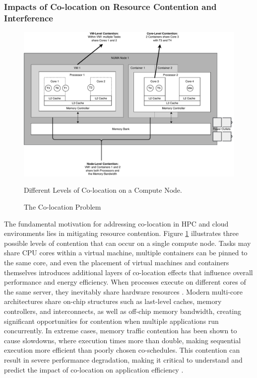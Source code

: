 \subsubsection{Impacts of Co-location on Resource Contention and Interference}
\label{sec:background_colocation_interference}

\begin{figure}[H]
    \centering
    \includegraphics[scale=0.5]{fig/02/02-coloc-overview.pdf}
    \small
    \caption{The Co-location Problem}
    \label{fig:02-coloc-overview}
    \tiny
    Different Levels of Co-location on a Compute Node.
\end{figure}

The fundamental motivation for addressing co-location in HPC and cloud environments lies in mitigating resource contention. Figure \ref{fig:02-coloc-overview} illustrates three possible levels of contention that can occur on a single compute node. Tasks may share CPU cores within a virtual machine, multiple containers can be pinned to the same core, and even the placement of virtual machines and containers themselves introduces additional layers of co-location effects that influence overall performance and energy efficiency. When processes execute on different cores of the same server, they inevitably share hardware resources \cite{Blagodurov_2010} \cite{7349920}. Modern multi-core architectures share on-chip structures such as last-level caches, memory controllers, and interconnects, as well as off-chip memory bandwidth, creating significant opportunities for contention when multiple applications run concurrently. In extreme cases, memory traffic contention has been shown to cause slowdowns, where execution times more than double, making sequential execution more efficient than poorly chosen co-schedules. This contention can result in severe performance degradation, making it critical to understand and predict the impact of co-location on application efficiency \cite{Blagodurov_2012} \cite{inproceedings} \cite{10.1007/978-3-031-48803-0_31}.

